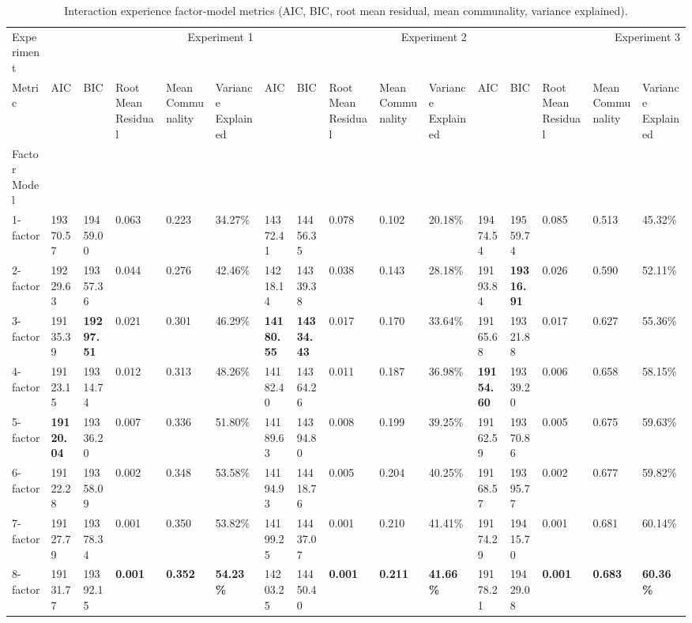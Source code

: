 \begin{table}
\caption{Interaction experience factor-model metrics (AIC, BIC, root mean residual, mean communality, variance explained).}
\label{tab:interaction_factor_metrics}
\begin{tabular}{llllllllllllllll}
\toprule
Experiment & \multicolumn{5}{r}{Experiment 1} & \multicolumn{5}{r}{Experiment 2} & \multicolumn{5}{r}{Experiment 3} \\
Metric & AIC & BIC & Root Mean Residual & Mean Communality & Variance Explained & AIC & BIC & Root Mean Residual & Mean Communality & Variance Explained & AIC & BIC & Root Mean Residual & Mean Communality & Variance Explained \\
Factor Model &  &  &  &  &  &  &  &  &  &  &  &  &  &  &  \\
\midrule
1-factor & 19370.57 & 19459.00 & 0.063 & 0.223 & 34.27\% & 14372.41 & 14456.35 & 0.078 & 0.102 & 20.18\% & 19474.54 & 19559.74 & 0.085 & 0.513 & 45.32\% \\
2-factor & 19229.63 & 19357.36 & 0.044 & 0.276 & 42.46\% & 14218.14 & 14339.38 & 0.038 & 0.143 & 28.18\% & 19193.84 & \textbf{19316.91} & 0.026 & 0.590 & 52.11\% \\
3-factor & 19135.39 & \textbf{19297.51} & 0.021 & 0.301 & 46.29\% & \textbf{14180.55} & \textbf{14334.43} & 0.017 & 0.170 & 33.64\% & 19165.68 & 19321.88 & 0.017 & 0.627 & 55.36\% \\
4-factor & 19123.15 & 19314.74 & 0.012 & 0.313 & 48.26\% & 14182.40 & 14364.26 & 0.011 & 0.187 & 36.98\% & \textbf{19154.60} & 19339.20 & 0.006 & 0.658 & 58.15\% \\
5-factor & \textbf{19120.04} & 19336.20 & 0.007 & 0.336 & 51.80\% & 14189.63 & 14394.80 & 0.008 & 0.199 & 39.25\% & 19162.59 & 19370.86 & 0.005 & 0.675 & 59.63\% \\
6-factor & 19122.28 & 19358.09 & 0.002 & 0.348 & 53.58\% & 14194.93 & 14418.76 & 0.005 & 0.204 & 40.25\% & 19168.57 & 19395.77 & 0.002 & 0.677 & 59.82\% \\
7-factor & 19127.79 & 19378.34 & 0.001 & 0.350 & 53.82\% & 14199.25 & 14437.07 & 0.001 & 0.210 & 41.41\% & 19174.29 & 19415.70 & 0.001 & 0.681 & 60.14\% \\
8-factor & 19131.77 & 19392.15 & \textbf{0.001} & \textbf{0.352} & \textbf{54.23\%} & 14203.25 & 14450.40 & \textbf{0.001} & \textbf{0.211} & \textbf{41.66\%} & 19178.21 & 19429.08 & \textbf{0.001} & \textbf{0.683} & \textbf{60.36\%} \\
\bottomrule
\end{tabular}
\end{table}
